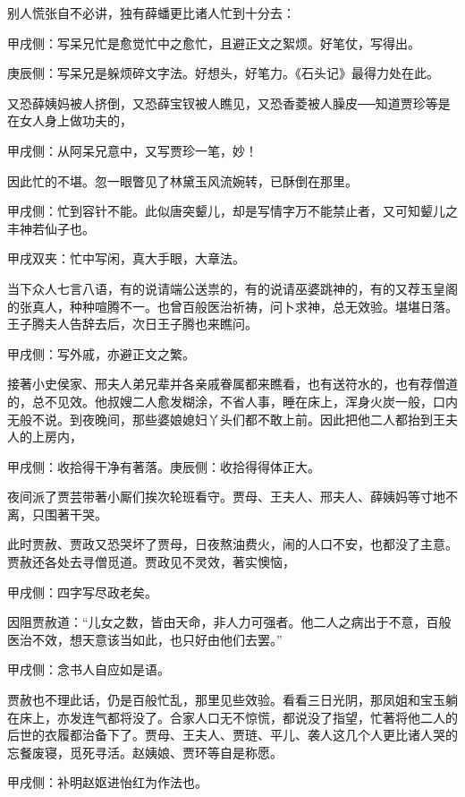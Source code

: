 \begin{parag}
    别人慌张自不必讲，独有薛蟠更比诸人忙到十分去：\begin{note}甲戌侧：写呆兄忙是愈觉忙中之愈忙，且避正文之絮烦。好笔仗，写得出。\end{note}\begin{note}庚辰侧：写呆兄是躲烦碎文字法。好想头，好笔力。《石头记》最得力处在此。\end{note}又恐薛姨妈被人挤倒，又恐薛宝钗被人瞧见，又恐香菱被人臊皮──知道贾珍等是在女人身上做功夫的，\begin{note}甲戌侧：从阿呆兄意中，又写贾珍一笔，妙！\end{note}因此忙的不堪。忽一眼瞥见了林黛玉风流婉转，已酥倒在那里。\begin{note}甲戌侧：忙到容针不能。此似唐突颦儿，却是写情字万不能禁止者，又可知颦儿之丰神若仙子也。\end{note}\begin{note}甲戌双夹：忙中写闲，真大手眼，大章法。\end{note}
\end{parag}


\begin{parag}
    当下众人七言八语，有的说请端公送祟的，有的说请巫婆跳神的，有的又荐玉皇阁的张真人，种种喧腾不一。也曾百般医治祈祷，问卜求神，总无效验。堪堪日落。王子腾夫人告辞去后，次日王子腾也来瞧问。\begin{note}甲戌侧：写外戚，亦避正文之繁。\end{note}接著小史侯家、邢夫人弟兄辈并各亲戚眷属都来瞧看，也有送符水的，也有荐僧道的，总不见效。他叔嫂二人愈发糊涂，不省人事，睡在床上，浑身火炭一般，口内无般不说。到夜晚间，那些婆娘媳妇丫头们都不敢上前。因此把他二人都抬到王夫人的上房内，\begin{note}甲戌侧：收拾得干净有著落。庚辰侧：收拾得得体正大。\end{note}夜间派了贾芸带著小厮们挨次轮班看守。贾母、王夫人、邢夫人、薛姨妈等寸地不离，只围著干哭。
\end{parag}


\begin{parag}
    此时贾赦、贾政又恐哭坏了贾母，日夜熬油费火，闹的人口不安，也都没了主意。贾赦还各处去寻僧觅道。贾政见不灵效，著实懊恼，\begin{note}甲戌侧：四字写尽政老矣。\end{note}因阻贾赦道：“儿女之数，皆由天命，非人力可强者。他二人之病出于不意，百般医治不效，想天意该当如此，也只好由他们去罢。”\begin{note}甲戌侧：念书人自应如是语。\end{note}贾赦也不理此话，仍是百般忙乱，那里见些效验。看看三日光阴，那凤姐和宝玉躺在床上，亦发连气都将没了。合家人口无不惊慌，都说没了指望，忙著将他二人的后世的衣履都治备下了。贾母、王夫人、贾琏、平儿、袭人这几个人更比诸人哭的忘餐废寝，觅死寻活。赵姨娘、贾环等自是称愿。\begin{note}甲戌侧：补明赵妪进怡红为作法也。\end{note}
\end{parag}


